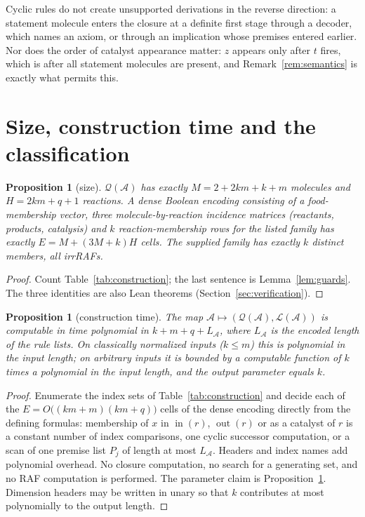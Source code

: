 \documentclass[11pt,a4paper]{article}
\theoremstyle{plain}
\newtheorem{proposition}[theorem]{Proposition}
\theoremstyle{definition}
\theoremstyle{remark}
\newcommand{\inn}{\operatorname{in}}
\newcommand{\out}{\operatorname{out}}
\newcommand{\cL}{\mathcal{L}}
\newcommand{\cA}{\mathcal{A}}
\newcommand{\cQ}{\mathcal{Q}}
\begin{document}
Cyclic rules do not create unsupported derivations in the reverse direction: a statement molecule enters the closure at a definite first stage through a decoder, which names an axiom, or through an implication whose premises entered earlier. Nor does the order of catalyst appearance matter: $z$ appears only after $t$ fires, which is after all statement molecules are present, and Remark~\ref{rem:semantics} is exactly what permits this.

\section{Size, construction time and the classification}\label{sec:classification}

\begin{proposition}[size]\label{prop:size}
$\cQ(\cA)$ has exactly $M=2+2km+k+m$ molecules and $H=2km+q+1$ reactions. A dense Boolean encoding consisting of a food-membership vector, three molecule-by-reaction incidence matrices (reactants, products, catalysis) and $k$ reaction-membership rows for the listed family has exactly $E=M+(3M+k)H$ cells. The supplied family has exactly $k$ distinct members, all irrRAFs.
\end{proposition}

\begin{proof}
Count Table~\ref{tab:construction}; the last sentence is Lemma~\ref{lem:guards}. The three identities are also Lean theorems (Section~\ref{sec:verification}).
\end{proof}

\begin{proposition}[construction time]\label{prop:time}
The map $\cA\mapsto(\cQ(\cA),\cL(\cA))$ is computable in time polynomial in $k+m+q+L_\cA$, where $L_\cA$ is the encoded length of the rule lists. On classically normalized inputs ($k\le m$) this is polynomial in the input length; on arbitrary inputs it is bounded by a computable function of $k$ times a polynomial in the input length, and the output parameter equals $k$.
\end{proposition}

\begin{proof}
Enumerate the index sets of Table~\ref{tab:construction} and decide each of the $E=O\bigl((km+m)(km+q)\bigr)$ cells of the dense encoding directly from the defining formulas: membership of $x$ in $\inn(r)$, $\out(r)$ or as a catalyst of $r$ is a constant number of index comparisons, one cyclic successor computation, or a scan of one premise list $P_j$ of length at most $L_\cA$. Headers and index names add polynomial overhead. No closure computation, no search for a generating set, and no RAF computation is performed. The parameter claim is Proposition~\ref{prop:size}. Dimension headers may be written in unary so that $k$ contributes at most polynomially to the output length.
\end{proof}
\end{document}

